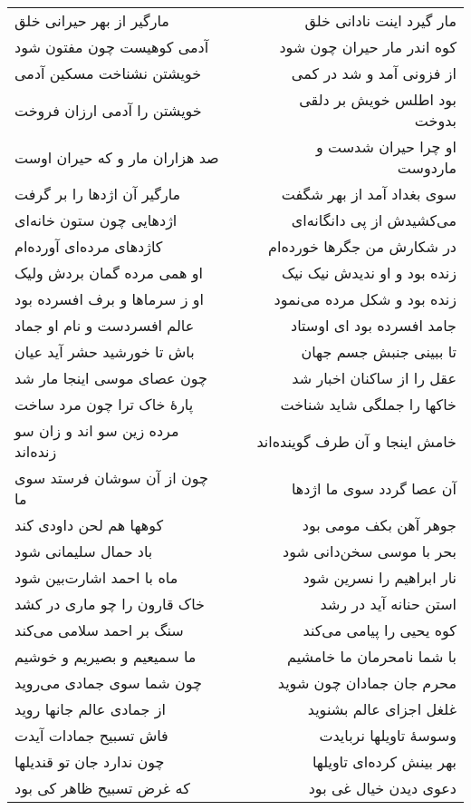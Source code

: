 \begin{center}
\begin{longtable}{l p{0.5cm} r}
مارگیر از بهر حیرانی خلق
&&
مار گیرد اینت نادانی خلق
\\
آدمی کوهیست چون مفتون شود
&&
کوه اندر مار حیران چون شود
\\
خویشتن نشناخت مسکین آدمی
&&
از فزونی آمد و شد در کمی
\\
خویشتن را آدمی ارزان فروخت
&&
بود اطلس خویش بر دلقی بدوخت
\\
صد هزاران مار و که حیران اوست
&&
او چرا حیران شدست و ماردوست
\\
مارگیر آن اژدها را بر گرفت
&&
سوی بغداد آمد از بهر شگفت
\\
اژدهایی چون ستون خانه‌ای
&&
می‌کشیدش از پی دانگانه‌ای
\\
کاژدهای مرده‌ای آورده‌ام
&&
در شکارش من جگرها خورده‌ام
\\
او همی مرده گمان بردش ولیک
&&
زنده بود و او ندیدش نیک نیک
\\
او ز سرماها و برف افسرده بود
&&
زنده بود و شکل مرده می‌نمود
\\
عالم افسردست و نام او جماد
&&
جامد افسرده بود ای اوستاد
\\
باش تا خورشید حشر آید عیان
&&
تا ببینی جنبش جسم جهان
\\
چون عصای موسی اینجا مار شد
&&
عقل را از ساکنان اخبار شد
\\
پارهٔ خاک ترا چون مرد ساخت
&&
خاکها را جملگی شاید شناخت
\\
مرده زین سو اند و زان سو زنده‌اند
&&
خامش اینجا و آن طرف گوینده‌اند
\\
چون از آن سوشان فرستد سوی ما
&&
آن عصا گردد سوی ما اژدها
\\
کوهها هم لحن داودی کند
&&
جوهر آهن بکف مومی بود
\\
باد حمال سلیمانی شود
&&
بحر با موسی سخن‌دانی شود
\\
ماه با احمد اشارت‌بین شود
&&
نار ابراهیم را نسرین شود
\\
خاک قارون را چو ماری در کشد
&&
استن حنانه آید در رشد
\\
سنگ بر احمد سلامی می‌کند
&&
کوه یحیی را پیامی می‌کند
\\
ما سمیعیم و بصیریم و خوشیم
&&
با شما نامحرمان ما خامشیم
\\
چون شما سوی جمادی می‌روید
&&
محرم جان جمادان چون شوید
\\
از جمادی عالم جانها روید
&&
غلغل اجزای عالم بشنوید
\\
فاش تسبیح جمادات آیدت
&&
وسوسهٔ تاویلها نربایدت
\\
چون ندارد جان تو قندیلها
&&
بهر بینش کرده‌ای تاویلها
\\
که غرض تسبیح ظاهر کی بود
&&
دعوی دیدن خیال غی بود
\\

\end{longtable}
\end{center}
